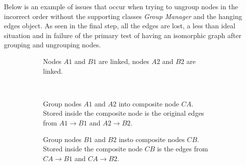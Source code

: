 Below is an example of issues that occur when trying to ungroup nodes in the incorrect order without the supporting classes \textit{Group Manager} and the hanging edges object. As seen in the final step, all the edges are lost, a less than ideal situation and in failure of the primary test of having an isomorphic graph after grouping and ungrouping nodes.

\begin{figure}[H]

  \begin{subfigure}[t]{0.5\textwidth}
    \centering
    \caption{Nodes $A1$ and $B1$ are linked, nodes $A2$ and $B2$ are linked.}
  \end{subfigure}
  ~
  \begin{subfigure}[t]{0.5\textwidth}
    \centering
    \caption{Group nodes $A1$ and $A2$ into composite node $CA$. Stored inside the composite node is the original edges from $A1\rightarrow B1$ and $A2\rightarrow B2$.}
  \end{subfigure}
  \begin{subfigure}[t]{0.5\textwidth}
    \centering
    \caption{Group nodes $B1$ and $B2$ insto composite nodes $CB$. Stored inside the composite node $CB$ is the edges from $CA\rightarrow B1$ and $CA\rightarrow B2$.}
  \end{subfigure}
  ~
  \begin{subfigure}[t]{0.5\textwidth}
    \centering
\end{subfigure}
\end{figure}
